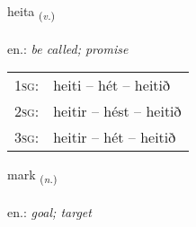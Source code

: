 \documentclass[frontgrid, backgrid]{flacards}\usepackage[]{graphicx}\usepackage[]{xcolor}
\begin{document}
\renewcommand{\flhead}{\vskip5pt \fboxsep=0pt {\small\bfseries\footnotesize Sagnorð | Verb}}
\renewcommand{\fcfoot}{\vskip5pt \fboxsep=0pt \hspace{2pt}{\small\bfseries\footnotesize 1K}}

\renewcommand{\blhead}{\vskip5pt {\small\bfseries\footnotesize Sagnorð | Verb }}
\renewcommand{\bcfoot}{\vskip5pt \hspace{2pt}{\small\bfseries\footnotesize 1K}}


{heita \small{\textsubscript{(\textit{v.})}} \\[1ex] %
\textphonetic{[heiːta]} \\
en.: \emph{be called; promise} \\  [2ex]
\renewcommand*{\arraystretch}{0.8}
\begin{tabular}{p{1cm}l}
\textsc{1sg}: & heiti -- hét -- heitið \\ 
\textsc{2sg}: & heitir -- hést -- heitið \\ 
\textsc{3sg}: & heitir -- hét -- heitið \\ 
\end{tabular}
}

\renewcommand{\flhead}{\vskip5pt \fboxsep=0pt {\small\bfseries\footnotesize Nafnorð | Noun}}
\renewcommand{\fcfoot}{\vskip5pt \fboxsep=0pt \hspace{2pt}{\small\bfseries\footnotesize 1K}}

\renewcommand{\blhead}{\vskip5pt {\small\bfseries\footnotesize Nafnorð | Noun }}
\renewcommand{\bcfoot}{\vskip5pt \hspace{2pt}{\small\bfseries\footnotesize 1K}}


{mark \small{\textsubscript{(\textit{n.})}} \\[1ex] %
\textphonetic{[mar̥k]} \\
en.: \emph{goal; target} \\  [2ex]
\renewcommand*{\arraystretch}{0.8}
}
\end{document}
